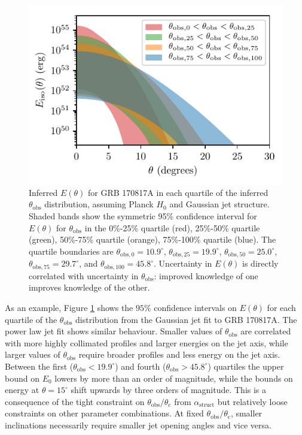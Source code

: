 \documentclass[twocolumn]{aastex62}
\newcommand{\grbbns}{GRB 170817A}
\newcommand{\thobs}{\ensuremath{\theta_{\mathrm{obs}}}}
\newcommand{\thC}{\ensuremath{\theta_{\mathrm{c}}}}
\begin{document}
\begin{figure}
	\includegraphics[width=\columnwidth]{figs/fit_E_theta_model_0.pdf}
	\caption{Inferred $E(\theta)$ for \grbbns{} in each quartile of the inferred $\thobs$ distribution, assuming Planck $H_0$ and Gaussian jet structure. Shaded bands show the symmetric 95\% confidence interval for $E(\theta)$ for $\thobs$ in the 0\%-25\% quartile (red), 25\%-50\% quartile (green), 50\%-75\% quartile (orange), 75\%-100\% quartile (blue).  The quartile boundaries are $\theta_{\mathrm{obs}, 0} = 10.9^\circ$, $\theta_{\mathrm{obs}, 25} = 19.9^\circ$, $\theta_{\mathrm{obs}, 50} = 25.0^\circ$, $\theta_{\mathrm{obs}, 75} = 29.7^\circ$, and $\theta_{\mathrm{obs}, 100} = 45.8^\circ$.  Uncertainty in $E(\theta)$ is directly correlated with uncertainty in $\thobs$: improved knowledge of one improves knowledge of the other.\label{fig:fit_E_theta}}
\end{figure}

As an example, Figure \ref{fig:fit_E_theta} shows the $95\%$ confidence intervals on $E(\theta)$ for each quartile of the $\thobs$ distribution from the Gaussian jet fit to \grbbns{}. The power law jet fit shows similar behaviour. Smaller values of $\thobs$ are correlated with more highly collimated profiles and larger energies on the jet axis, while larger values of $\thobs$ require broader profiles and less energy on the jet axis. Between the first ($\thobs < 19.9^\circ$) and fourth ($\thobs > 45.8^\circ$) quartiles the upper bound on $E_0$ lowers by more than an order of magnitude, while the bounds on energy at $\theta = 15^\circ$ shift upwards by three orders of magnitude.  This is a consequence of the tight constraint on $\thobs/\thC$ from $\alpha_{\mathrm{struct}}$ but relatively loose constraints on other parameter combinations.  At fixed $\thobs/\thC$, smaller inclinations necessarily require smaller jet opening angles and vice versa.  
\end{document}
